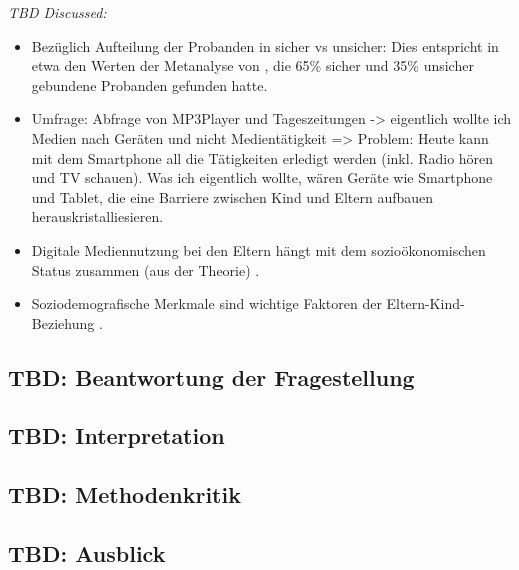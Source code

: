 \textit{TBD Discussed:}
\begin{itemize}
    \item Bezüglich Aufteilung der Probanden in sicher vs unsicher: Dies entspricht in etwa den Werten der Metanalyse von , die 65\% sicher und 35\% unsicher gebundene Probanden gefunden hatte.
    \item Umfrage: Abfrage von MP3Player und Tageszeitungen -> eigentlich wollte ich Medien nach Geräten und nicht Medientätigkeit => Problem: Heute kann mit dem Smartphone all die Tätigkeiten erledigt werden (inkl. Radio hören und TV schauen). Was ich eigentlich wollte, wären Geräte wie Smartphone und Tablet, die eine Barriere zwischen Kind und Eltern aufbauen herauskristalliesieren.
    \item Digitale Mediennutzung bei den Eltern hängt mit dem sozioökonomischen Status zusammen (aus der Theorie) \cite{Livingstone2015}.
    \item Soziodemografische Merkmale sind wichtige Faktoren der Eltern-Kind-Beziehung \cite{Kammerl2012}.
\end{itemize}


\subsection{TBD: Beantwortung der Fragestellung} \label{sec:BeantwortungFragestellung}

\subsection{TBD: Interpretation} \label{sec:Interpretation}

\subsection{TBD: Methodenkritik} \label{sec:Methodenkritik}

\subsection{TBD: Ausblick} \label{sec:Ausblick}